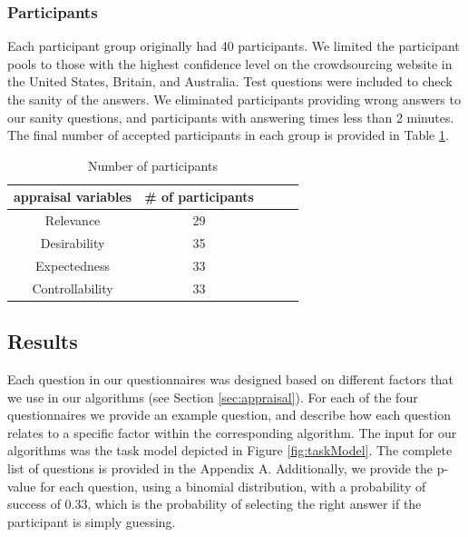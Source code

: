 \documentclass[12pt]{report}
\begin{document}
\subsubsection{Participants}
Each participant group originally had 40 participants. We limited the
participant pools to those with the highest confidence level on the
crowdsourcing website in the United States, Britain, and Australia. Test
questions were included to check the sanity of the answers. We eliminated
participants providing wrong answers to our sanity questions, and participants with
answering times less than 2 minutes. The final number of accepted participants
in each group is provided in Table \ref{tbl:statistics}.

\begin{table}[htbp]
\centering
\caption{Number of participants}
\begin{tabular}{|c|c|c|c|c|} \hline
appraisal variables & \# of participants\\ \hline 
Relevance &  29\\ \hline
Desirability & 35\\ \hline 
Expectedness & 33\\ \hline 
Controllability & 33\\ \hline
\end{tabular}
\label{tbl:statistics}
\end{table}

% 

\subsection{Results}
\label{sec:results-crowdsourcing}
Each question in our questionnaires was designed based on different factors that
we use in our algorithms (see Section \ref{sec:appraisal}).  For each of the
four questionnaires we provide an example question, and describe how each
question relates to a specific factor within the corresponding algorithm. The
input for our algorithms was the task model depicted in Figure
\ref{fig:taskModel}. The complete list of questions is provided in the Appendix
A. Additionally, we provide the p-value for each question, using a binomial
distribution, with a probability of success of 0.33, which is the probability of
selecting the right answer if the participant is simply guessing.
\end{document}
